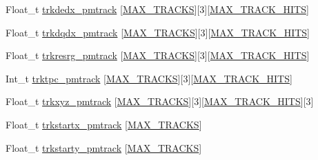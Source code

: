 \begin{DoxyCompactItemize}
Float\-\_\-t \hyperlink{classanatree_ad7277a76b6bcb971d0a96943117954d6}{trkdedx\-\_\-pmtrack} \mbox{[}\hyperlink{anatree__core__v09410002__orig_8h_a327fd4e796e4a0d78947524c96e4362e}{M\-A\-X\-\_\-\-T\-R\-A\-C\-K\-S}\mbox{]}\mbox{[}3\mbox{]}\mbox{[}\hyperlink{anatree__core__v09410002__orig_8h_ae75eb9050f16aa034339f05572523070}{M\-A\-X\-\_\-\-T\-R\-A\-C\-K\-\_\-\-H\-I\-T\-S}\mbox{]}
\item 
Float\-\_\-t \hyperlink{classanatree_a58473ac725f05967148c689020e3d771}{trkdqdx\-\_\-pmtrack} \mbox{[}\hyperlink{anatree__core__v09410002__orig_8h_a327fd4e796e4a0d78947524c96e4362e}{M\-A\-X\-\_\-\-T\-R\-A\-C\-K\-S}\mbox{]}\mbox{[}3\mbox{]}\mbox{[}\hyperlink{anatree__core__v09410002__orig_8h_ae75eb9050f16aa034339f05572523070}{M\-A\-X\-\_\-\-T\-R\-A\-C\-K\-\_\-\-H\-I\-T\-S}\mbox{]}
\item 
Float\-\_\-t \hyperlink{classanatree_a85f1b778c6742491c6c574120586bef3}{trkresrg\-\_\-pmtrack} \mbox{[}\hyperlink{anatree__core__v09410002__orig_8h_a327fd4e796e4a0d78947524c96e4362e}{M\-A\-X\-\_\-\-T\-R\-A\-C\-K\-S}\mbox{]}\mbox{[}3\mbox{]}\mbox{[}\hyperlink{anatree__core__v09410002__orig_8h_ae75eb9050f16aa034339f05572523070}{M\-A\-X\-\_\-\-T\-R\-A\-C\-K\-\_\-\-H\-I\-T\-S}\mbox{]}
\item 
Int\-\_\-t \hyperlink{classanatree_a9c7c79379748df8edd2db8055b236311}{trktpc\-\_\-pmtrack} \mbox{[}\hyperlink{anatree__core__v09410002__orig_8h_a327fd4e796e4a0d78947524c96e4362e}{M\-A\-X\-\_\-\-T\-R\-A\-C\-K\-S}\mbox{]}\mbox{[}3\mbox{]}\mbox{[}\hyperlink{anatree__core__v09410002__orig_8h_ae75eb9050f16aa034339f05572523070}{M\-A\-X\-\_\-\-T\-R\-A\-C\-K\-\_\-\-H\-I\-T\-S}\mbox{]}
\item 
Float\-\_\-t \hyperlink{classanatree_a42c839c1c99525e55acb300dd0a7b0be}{trkxyz\-\_\-pmtrack} \mbox{[}\hyperlink{anatree__core__v09410002__orig_8h_a327fd4e796e4a0d78947524c96e4362e}{M\-A\-X\-\_\-\-T\-R\-A\-C\-K\-S}\mbox{]}\mbox{[}3\mbox{]}\mbox{[}\hyperlink{anatree__core__v09410002__orig_8h_ae75eb9050f16aa034339f05572523070}{M\-A\-X\-\_\-\-T\-R\-A\-C\-K\-\_\-\-H\-I\-T\-S}\mbox{]}\mbox{[}3\mbox{]}
\item 
Float\-\_\-t \hyperlink{classanatree_ac4b2584b457cd867da7be50a679c8f92}{trkstartx\-\_\-pmtrack} \mbox{[}\hyperlink{anatree__core__v09410002__orig_8h_a327fd4e796e4a0d78947524c96e4362e}{M\-A\-X\-\_\-\-T\-R\-A\-C\-K\-S}\mbox{]}
\item 
Float\-\_\-t \hyperlink{classanatree_a8140ac679883315316eb95cc748aa834}{trkstarty\-\_\-pmtrack} \mbox{[}\hyperlink{anatree__core__v09410002__orig_8h_a327fd4e796e4a0d78947524c96e4362e}{M\-A\-X\-\_\-\-T\-R\-A\-C\-K\-S}\mbox{]}

\end{DoxyCompactItemize}
